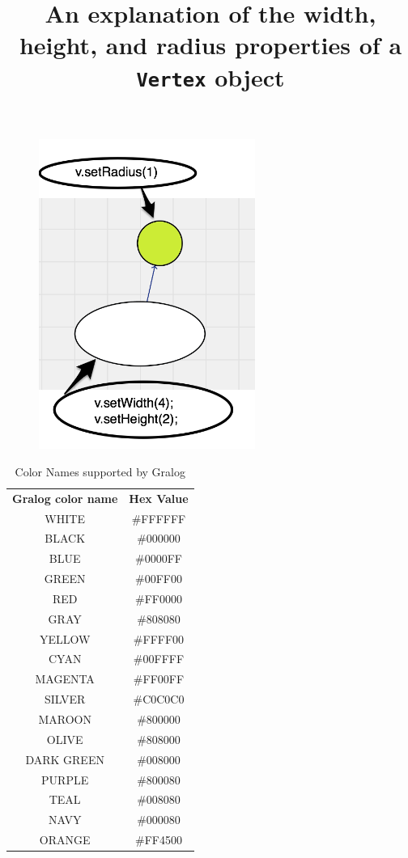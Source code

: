 \begin{figure}[H]
\title{An explanation of the width, height, and radius properties of a \texttt{Vertex} object}
\label{radiusWidthHeightDiagram}
\centering
\includegraphics[width=200pt]{radiusWidthHeightDiagram.png}
\end{figure}


\begin{table}[h!]
  \begin{center}
    \caption{Color Names supported by Gralog}
    \label{colorNamesSupportedByGralog}
    \begin{tabular}{c|c} %
      \textbf{Gralog color name} & \textbf{Hex Value}\\
      WHITE   &\#FFFFFF\\
\hline
BLACK   &\#000000\\
\hline
BLUE    &\#0000FF\\
\hline
GREEN   &\#00FF00\\
\hline
RED     &\#FF0000\\
\hline
GRAY    &\#808080\\
\hline
YELLOW  &\#FFFF00\\
\hline
CYAN    &\#00FFFF\\
\hline
MAGENTA &\#FF00FF\\
\hline
SILVER  &\#C0C0C0\\
\hline
MAROON  &\#800000\\
\hline
OLIVE &\#808000\\
\hline
DARK GREEN &\#008000\\
\hline
PURPLE  &\#800080\\
\hline
TEAL  &\#008080\\
\hline
NAVY    &\#000080\\
\hline
ORANGE  &\#FF4500
    \end{tabular}
  \end{center}
\end{table}

